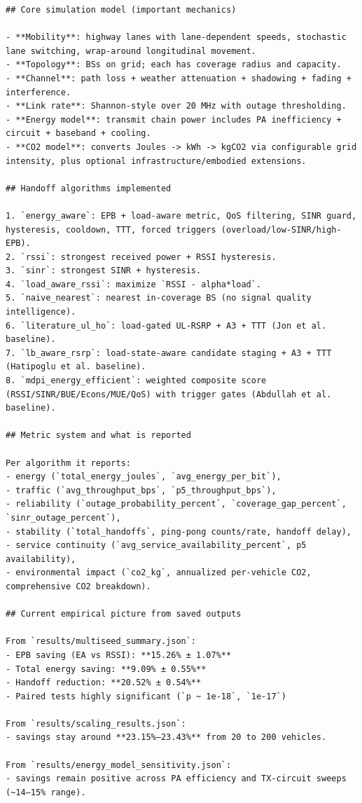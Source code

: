 \documentclass[11pt,a4paper]{article}
\newenvironment{assistantbox}
  {\begin{tcolorbox}[
    breakable,
    colback=AsstBG,
    colframe=AsstBorder,
    title=Project Overview Extract,
    fonttitle=\bfseries\small\color{white},
    coltitle=white,
    colbacktitle=AsstBorder,
    boxrule=0.5pt,
    arc=1.2mm,
    left=1.4mm,right=1.4mm,top=0.8mm,bottom=0.8mm,
    boxsep=0.6mm,
    before skip=0pt,
    after skip=0pt
  ]}
  {\end{tcolorbox}}
\begin{document}
\begin{assistantbox}
\begin{Verbatim}[breaklines=true,breakanywhere=true]
## Core simulation model (important mechanics)

- **Mobility**: highway lanes with lane-dependent speeds, stochastic lane switching, wrap-around longitudinal movement.
- **Topology**: BSs on grid; each has coverage radius and capacity.
- **Channel**: path loss + weather attenuation + shadowing + fading + interference.
- **Link rate**: Shannon-style over 20 MHz with outage thresholding.
- **Energy model**: transmit chain power includes PA inefficiency + circuit + baseband + cooling.
- **CO2 model**: converts Joules -> kWh -> kgCO2 via configurable grid intensity, plus optional infrastructure/embodied extensions.

## Handoff algorithms implemented

1. `energy_aware`: EPB + load-aware metric, QoS filtering, SINR guard, hysteresis, cooldown, TTT, forced triggers (overload/low-SINR/high-EPB).
2. `rssi`: strongest received power + RSSI hysteresis.
3. `sinr`: strongest SINR + hysteresis.
4. `load_aware_rssi`: maximize `RSSI - alpha*load`.
5. `naive_nearest`: nearest in-coverage BS (no signal quality intelligence).
6. `literature_ul_ho`: load-gated UL-RSRP + A3 + TTT (Jon et al. baseline).
7. `lb_aware_rsrp`: load-state-aware candidate staging + A3 + TTT (Hatipoglu et al. baseline).
8. `mdpi_energy_efficient`: weighted composite score (RSSI/SINR/BUE/Econs/MUE/QoS) with trigger gates (Abdullah et al. baseline).

## Metric system and what is reported

Per algorithm it reports:
- energy (`total_energy_joules`, `avg_energy_per_bit`),
- traffic (`avg_throughput_bps`, `p5_throughput_bps`),
- reliability (`outage_probability_percent`, `coverage_gap_percent`, `sinr_outage_percent`),
- stability (`total_handoffs`, ping-pong counts/rate, handoff delay),
- service continuity (`avg_service_availability_percent`, p5 availability),
- environmental impact (`co2_kg`, annualized per-vehicle CO2, comprehensive CO2 breakdown).

## Current empirical picture from saved outputs

From `results/multiseed_summary.json`:
- EPB saving (EA vs RSSI): **15.26% ± 1.07%**
- Total energy saving: **9.09% ± 0.55%**
- Handoff reduction: **20.52% ± 0.54%**
- Paired tests highly significant (`p ~ 1e-18`, `1e-17`)

From `results/scaling_results.json`:
- savings stay around **23.15%–23.43%** from 20 to 200 vehicles.

From `results/energy_model_sensitivity.json`:
- savings remain positive across PA efficiency and TX-circuit sweeps (~14–15% range).


\end{Verbatim}
\end{assistantbox}
\end{document}
